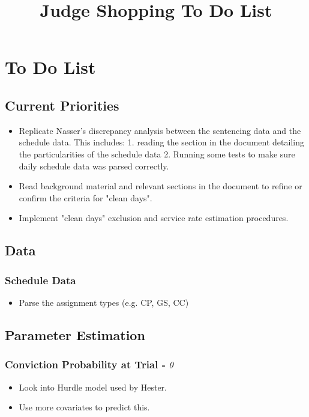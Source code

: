 \documentclass[11pt]{article}
\title{Judge Shopping To Do List}
\begin{document}
\maketitle
\tableofcontents

\section{To Do List}
  \subsection*{Current Priorities}
    \begin{itemize}
      \item Replicate Nasser's discrepancy analysis between the sentencing data and
      the schedule data. This includes: 1. reading the section in the document detailing the
      particularities of the schedule data 2. Running some tests to make sure  daily schedule data
      was parsed correctly.
      \item Read background material and relevant sections in the document to refine or
      confirm the criteria for "clean days".
      \item Implement "clean days" exclusion and service rate estimation procedures.
    \end{itemize}

  \subsection{Data}
    \subsubsection{Schedule Data}
      \begin{itemize}
        \item Parse the assignment types (e.g. CP, GS, CC)
      \end{itemize}

  \subsection{Parameter Estimation}
    \subsubsection{Conviction Probability at Trial - $\theta$}
      \begin{itemize}
        \item Look into Hurdle model used by Hester.
        \item Use more covariates to predict this.
      \end{itemize}
\end{document}
